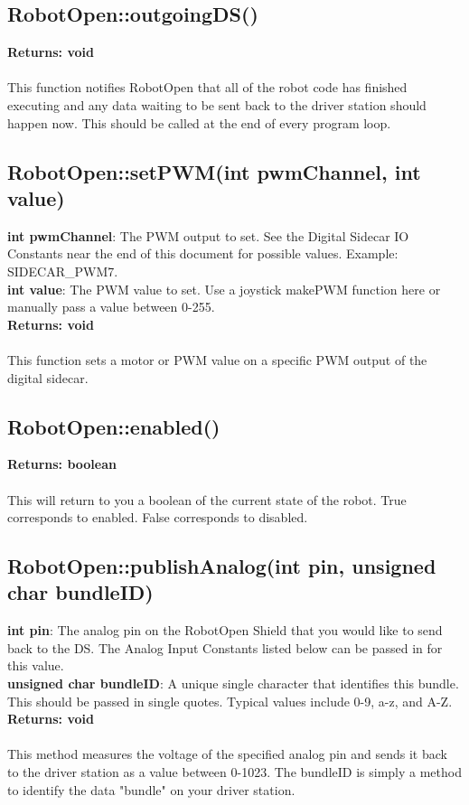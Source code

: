 \documentclass[11pt]{article} %
\begin{document}
\subsection{RobotOpen::outgoingDS()}
\textbf{Returns: void}\\\\
This function notifies RobotOpen that all of the robot code has finished executing and any data waiting to be sent back to the driver station should happen now. This should be called at the end of every program loop.
\subsection{RobotOpen::setPWM(int pwmChannel, int value)}
\textbf{int pwmChannel}: The PWM output to set. See the Digital Sidecar IO Constants near the end of this document for possible values. Example: SIDECAR\_PWM7.\\
\textbf{int value}: The PWM value to set. Use a joystick makePWM function here or manually pass a value between 0-255.\\
\textbf{Returns: void}\\\\
This function sets a motor or PWM value on a specific PWM output of the digital sidecar. 
\subsection{RobotOpen::enabled()}
\textbf{Returns: boolean}\\\\
This will return to you a boolean of the current state of the robot. True corresponds to enabled. False corresponds to disabled.

\subsection{RobotOpen::publishAnalog(int pin, unsigned char bundleID)}
\textbf{int pin}: The analog pin on the RobotOpen Shield that you would like to send back to the DS. The Analog Input Constants listed below can be passed in for this value.\\
\textbf{unsigned char bundleID}: A unique single character that identifies this bundle. This should be passed in single quotes. Typical values include 0-9, a-z, and A-Z.\\
\textbf{Returns: void}\\\\
This method measures the voltage of the specified analog pin and sends it back to the driver station as a value between 0-1023. The bundleID is simply a method to identify the data "bundle" on your driver station.
\end{document}
